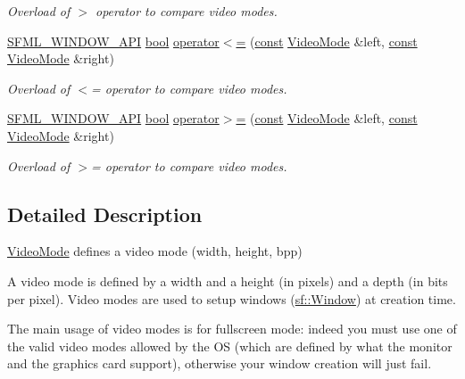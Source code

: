 \begin{DoxyCompactItemize}
\begin{DoxyCompactList}\small\item\em Overload of $>$ operator to compare video modes. \end{DoxyCompactList}\item 
\hyperlink{sfml_2dep_2_s_f_m_l-2_84_82_2include_2_s_f_m_l_2_window_2_export_8hpp_a1ab885b7907ee088350359516d68be64}{S\-F\-M\-L\-\_\-\-W\-I\-N\-D\-O\-W\-\_\-\-A\-P\-I} \hyperlink{term__entry_8h_a002004ba5d663f149f6c38064926abac}{bool} \hyperlink{classsf_1_1_video_mode_a09b0a83f9135d934e540800bad12f0ca}{operator$<$=} (\hyperlink{term__entry_8h_a57bd63ce7f9a353488880e3de6692d5a}{const} \hyperlink{classsf_1_1_video_mode}{Video\-Mode} \&left, \hyperlink{term__entry_8h_a57bd63ce7f9a353488880e3de6692d5a}{const} \hyperlink{classsf_1_1_video_mode}{Video\-Mode} \&right)
\begin{DoxyCompactList}\small\item\em Overload of $<$= operator to compare video modes. \end{DoxyCompactList}\item 
\hyperlink{sfml_2dep_2_s_f_m_l-2_84_82_2include_2_s_f_m_l_2_window_2_export_8hpp_a1ab885b7907ee088350359516d68be64}{S\-F\-M\-L\-\_\-\-W\-I\-N\-D\-O\-W\-\_\-\-A\-P\-I} \hyperlink{term__entry_8h_a002004ba5d663f149f6c38064926abac}{bool} \hyperlink{classsf_1_1_video_mode_a7f7983e336203d34c9878c77fff60f1f}{operator$>$=} (\hyperlink{term__entry_8h_a57bd63ce7f9a353488880e3de6692d5a}{const} \hyperlink{classsf_1_1_video_mode}{Video\-Mode} \&left, \hyperlink{term__entry_8h_a57bd63ce7f9a353488880e3de6692d5a}{const} \hyperlink{classsf_1_1_video_mode}{Video\-Mode} \&right)
\begin{DoxyCompactList}\small\item\em Overload of $>$= operator to compare video modes. \end{DoxyCompactList}\end{DoxyCompactItemize}


\subsection{Detailed Description}
\hyperlink{classsf_1_1_video_mode}{Video\-Mode} defines a video mode (width, height, bpp) 

A video mode is defined by a width and a height (in pixels) and a depth (in bits per pixel). Video modes are used to setup windows (\hyperlink{classsf_1_1_window}{sf\-::\-Window}) at creation time.

The main usage of video modes is for fullscreen mode\-: indeed you must use one of the valid video modes allowed by the O\-S (which are defined by what the monitor and the graphics card support), otherwise your window creation will just fail.

